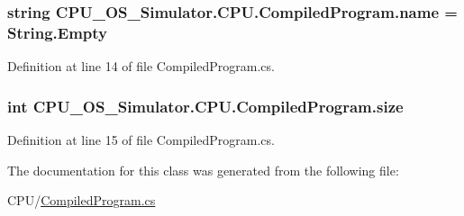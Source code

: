 \hypertarget{class_c_p_u___o_s___simulator_1_1_c_p_u_1_1_compiled_program_afa16131ff99534fd4fe9bc4aaa21ac02}{}
\subsubsection[{name}]{\setlength{\rightskip}{0pt plus 5cm}string C\+P\+U\+\_\+\+O\+S\+\_\+\+Simulator.\+C\+P\+U.\+Compiled\+Program.\+name = String.\+Empty\hspace{0.3cm}{\ttfamily [private]}}\label{class_c_p_u___o_s___simulator_1_1_c_p_u_1_1_compiled_program_afa16131ff99534fd4fe9bc4aaa21ac02}


Definition at line 14 of file Compiled\+Program.\+cs.

\hypertarget{class_c_p_u___o_s___simulator_1_1_c_p_u_1_1_compiled_program_ac3d1adb46ebd2132f53d3a1b880acc58}{}
\subsubsection[{size}]{\setlength{\rightskip}{0pt plus 5cm}int C\+P\+U\+\_\+\+O\+S\+\_\+\+Simulator.\+C\+P\+U.\+Compiled\+Program.\+size\hspace{0.3cm}{\ttfamily [private]}}\label{class_c_p_u___o_s___simulator_1_1_c_p_u_1_1_compiled_program_ac3d1adb46ebd2132f53d3a1b880acc58}


Definition at line 15 of file Compiled\+Program.\+cs.



The documentation for this class was generated from the following file\+:\begin{DoxyCompactItemize}
\item 
C\+P\+U/\hyperlink{_compiled_program_8cs}{Compiled\+Program.\+cs}\end{DoxyCompactItemize}
